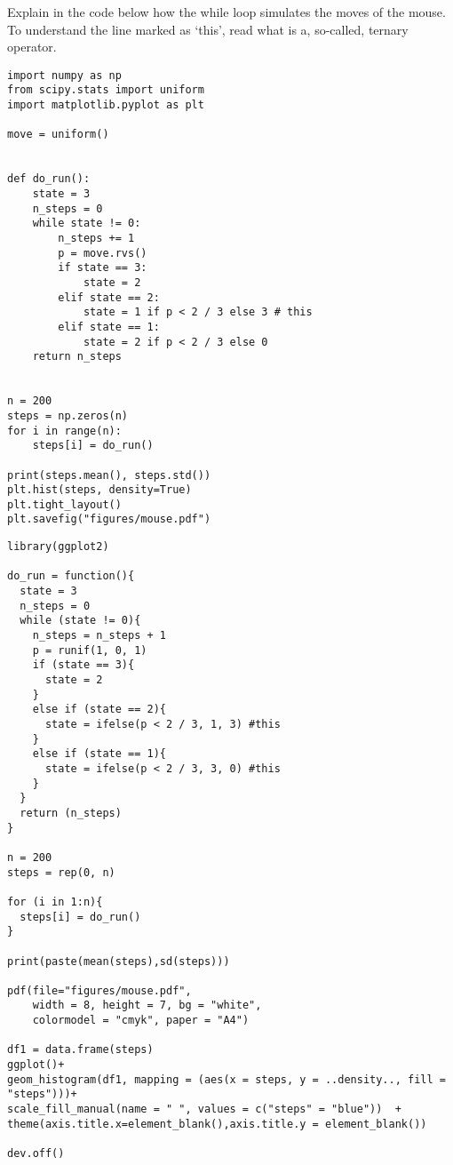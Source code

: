\begin{exercise}
Explain in the code below how the while loop simulates the moves of the mouse.  To understand the line marked as `this', read what is a, so-called, ternary operator.
\begin{verbatim}
import numpy as np
from scipy.stats import uniform
import matplotlib.pyplot as plt

move = uniform()


def do_run():
    state = 3
    n_steps = 0
    while state != 0:
        n_steps += 1
        p = move.rvs()
        if state == 3:
            state = 2
        elif state == 2:
            state = 1 if p < 2 / 3 else 3 # this
        elif state == 1:
            state = 2 if p < 2 / 3 else 0
    return n_steps


n = 200
steps = np.zeros(n)
for i in range(n):
    steps[i] = do_run()

print(steps.mean(), steps.std())
plt.hist(steps, density=True)
plt.tight_layout()
plt.savefig("figures/mouse.pdf")
\end{verbatim}

\begin{verbatim}
library(ggplot2)

do_run = function(){
  state = 3
  n_steps = 0
  while (state != 0){
    n_steps = n_steps + 1
    p = runif(1, 0, 1)
    if (state == 3){
      state = 2
    }
    else if (state == 2){
      state = ifelse(p < 2 / 3, 1, 3) #this
    }
    else if (state == 1){
      state = ifelse(p < 2 / 3, 3, 0) #this
    }
  }
  return (n_steps)
}

n = 200
steps = rep(0, n)

for (i in 1:n){
  steps[i] = do_run()
}

print(paste(mean(steps),sd(steps)))

pdf(file="figures/mouse.pdf",
    width = 8, height = 7, bg = "white",          
    colormodel = "cmyk", paper = "A4") 

df1 = data.frame(steps)
ggplot()+
geom_histogram(df1, mapping = (aes(x = steps, y = ..density.., fill = "steps")))+
scale_fill_manual(name = " ", values = c("steps" = "blue"))  +
theme(axis.title.x=element_blank(),axis.title.y = element_blank())

dev.off()
\end{verbatim}

\begin{solution}
\end{solution}
\end{exercise}
